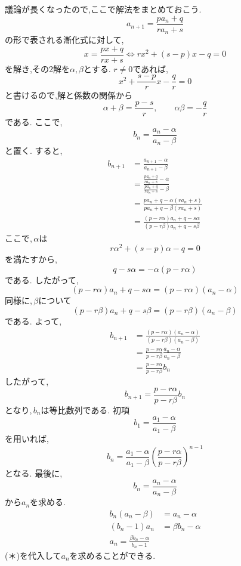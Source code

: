     議論が長くなったので,ここで解法をまとめておこう.
    \[
      a_{n+1}=\frac{pa_n+q}{ra_n+s} 
    \]
    の形で表される漸化式に対して,
    \[
      x= \frac{px+q}{rx+s} \Leftrightarrow rx^2+(s-p)x-q=0
    \]
    を解き,その2解を$\alpha,\beta$とする.
    $r\neq0$であれば,
    \[
      x^2+\frac{s-p}{r}x-\frac qr=0
    \]
    と書けるので,解と係数の関係から
    \[
      \alpha+\beta=\frac{p-s}{r},
      \qquad
      \alpha\beta=-\frac qr
    \]
    である.
    ここで,
    \[
      b_n=\frac{a_n-\alpha}{a_n-\beta}
    \]
    と置く.
    すると,
    \begin{align*}
      b_{n+1}&=\frac{a_{n+1}-\alpha}{a_{n+1}-\beta}\\
      &=\frac{\displaystyle\frac{pa_n+q}{ra_n+s}-\alpha}{\displaystyle\frac{pa_n+q}{ra_n+s}-\beta}\\
      &=\frac{pa_n+q-\alpha(ra_n+s)}{pa_n+q-\beta(ra_n+s)}\\
      &=\frac{(p-r\alpha)a_n+q-s\alpha}{(p-r\beta)a_n+q-s\beta}
    \end{align*}
    ここで,\,$\alpha$は
    \[
      r\alpha^2+(s-p)\alpha-q=0
    \]
    を満たすから,
    \[
      q-s\alpha=-\alpha(p-r\alpha)
    \]
    である.
    したがって,
    \[
      (p-r\alpha)a_n+q-s\alpha
      =(p-r\alpha)(a_n-\alpha)
    \]
    同様に,\,$\beta$について
    \[
      (p-r\beta)a_n+q-s\beta
      =(p-r\beta)(a_n-\beta)
    \]
    である.
    よって,
    \begin{align*}
      b_{n+1}&=\frac{(p-r\alpha)(a_n-\alpha)}{(p-r\beta)(a_n-\beta)}\\
      &=\frac{p-r\alpha}{p-r\beta}\frac{a_n-\alpha}{a_n-\beta}\\
      &=\frac{p-r\alpha}{p-r\beta}b_n
    \end{align*}
    したがって,
    \[
      b_{n+1}=\frac{p-r\alpha}{p-r\beta}b_n
    \]
    となり,\,$b_n$は等比数列である.
    初項
    \[
      b_1=\frac{a_1-\alpha}{a_1-\beta}
    \]
    を用いれば,
    \[
      b_n=\frac{a_1-\alpha}{a_1-\beta}\left(\frac{p-r\alpha}{p-r\beta}\right)^{n-1} \tag*{\(\cdots\) (＊)}
    \]
    となる.
    最後に,
    \[
      b_n=\frac{a_n-\alpha}{a_n-\beta}
    \]
    から$a_n$を求める.
    \begin{align*}
      b_n(a_n-\beta)&=a_n-\alpha\\
      (b_n-1)a_n&=\beta b_n-\alpha\\
      a_n=\frac{\beta b_n-\alpha}{b_n-1}
    \end{align*}
    (＊)を代入して$a_n$を求めることができる.

